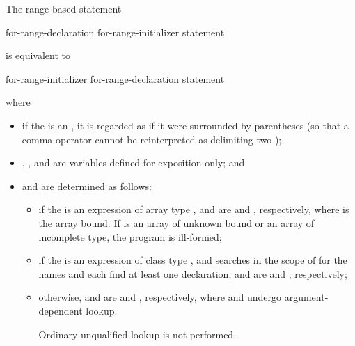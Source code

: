 \pnum
The range-based  statement
\begin{ncsimplebnf}
 \terminal{(}  for-range-declaration \terminal{:} for-range-initializer \terminal{)} statement
\end{ncsimplebnf}
is equivalent to
\begin{ncsimplebnf}
\terminal{\{}\br
\bnfindent {}\br
\bnfindent {} \terminal{\&\&} \terminal{=} for-range-initializer \terminal{;}\br
\bnfindent {}  \terminal{=}  \terminal{;}\br
\bnfindent {}  \terminal{=}  \terminal{;}\br
\bnfindent {} \terminal{(} \terminal{;}  \terminal{!=} \terminal{;} \terminal{++} \terminal{)} \terminal{\{}\br
\bnfindent\bnfindent for-range-declaration \terminal{=} \terminal{*}  \terminal{;}\br
\bnfindent\bnfindent statement\br
\bnfindent \terminal{\}}\br
\terminal{\}}
\end{ncsimplebnf}
where
\begin{itemize}
\item
if the  is an ,
it is regarded as if it were surrounded by parentheses (so that a comma operator
cannot be reinterpreted as delimiting two );

\item {}, , and  are variables defined for
exposition only; and

\item
{} and  are determined as follows:

\begin{itemize}
\item if the  is an expression of
array type ,  and  are
 and  \tcode{+} , respectively,
where  is
the array bound. If  is an array of unknown bound or an array of
incomplete type, the program is ill-formed;

\item if the  is
an expression of class type , and
searches in the scope of 
for the names  and 
each find at least one declaration,
 and  are
 and ,
respectively;

\item otherwise,  and  are
 and , respectively,
where  and  undergo
argument-dependent lookup.
\begin{note}
Ordinary unqualified lookup is not
performed.
\end{note}
\end{itemize}
\end{itemize}
